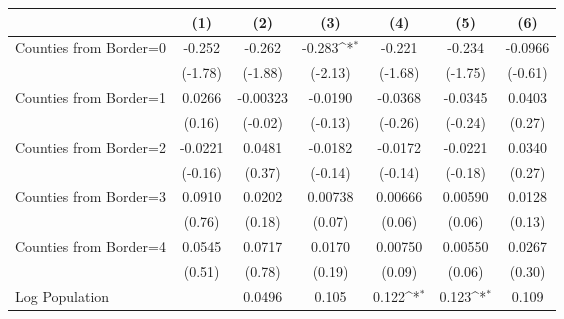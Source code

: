 {
\def\sym#1{\ifmmode^{#1}\else\(^{#1}\)\fi}
\begin{tabular}{l*{6}{c}}
\toprule
                    &\multicolumn{1}{c}{(1)}         &\multicolumn{1}{c}{(2)}         &\multicolumn{1}{c}{(3)}         &\multicolumn{1}{c}{(4)}         &\multicolumn{1}{c}{(5)}         &\multicolumn{1}{c}{(6)}         \\
\midrule
Counties from Border=0&      -0.252         &      -0.262         &      -0.283\sym{*}  &      -0.221         &      -0.234         &     -0.0966         \\
                    &     (-1.78)         &     (-1.88)         &     (-2.13)         &     (-1.68)         &     (-1.75)         &     (-0.61)         \\
\addlinespace
Counties from Border=1&      0.0266         &    -0.00323         &     -0.0190         &     -0.0368         &     -0.0345         &      0.0403         \\
                    &      (0.16)         &     (-0.02)         &     (-0.13)         &     (-0.26)         &     (-0.24)         &      (0.27)         \\
\addlinespace
Counties from Border=2&     -0.0221         &      0.0481         &     -0.0182         &     -0.0172         &     -0.0221         &      0.0340         \\
                    &     (-0.16)         &      (0.37)         &     (-0.14)         &     (-0.14)         &     (-0.18)         &      (0.27)         \\
\addlinespace
Counties from Border=3&      0.0910         &      0.0202         &     0.00738         &     0.00666         &     0.00590         &      0.0128         \\
                    &      (0.76)         &      (0.18)         &      (0.07)         &      (0.06)         &      (0.06)         &      (0.13)         \\
\addlinespace
Counties from Border=4&      0.0545         &      0.0717         &      0.0170         &     0.00750         &     0.00550         &      0.0267         \\
                    &      (0.51)         &      (0.78)         &      (0.19)         &      (0.09)         &      (0.06)         &      (0.30)         \\
\addlinespace
Log Population      &                     &      0.0496         &       0.105         &       0.122\sym{*}  &       0.123\sym{*}  &       0.109         \\

\end{tabular}}
